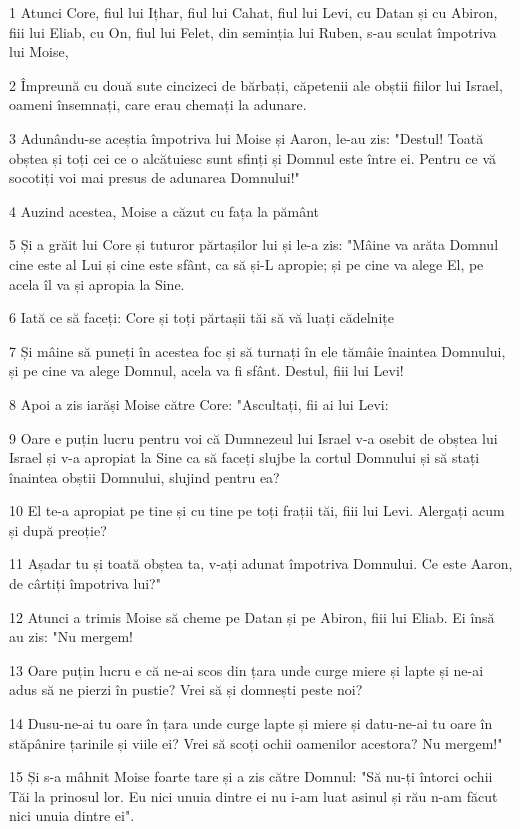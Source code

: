 \par 1 Atunci Core, fiul lui Ițhar, fiul lui Cahat, fiul lui Levi, cu Datan și cu Abiron, fiii lui Eliab, cu On, fiul lui Felet, din seminția lui Ruben, s-au sculat împotriva lui Moise,
\par 2 Împreună cu două sute cincizeci de bărbați, căpetenii ale obștii fiilor lui Israel, oameni însemnați, care erau chemați la adunare.
\par 3 Adunându-se aceștia împotriva lui Moise și Aaron, le-au zis: "Destul! Toată obștea și toți cei ce o alcătuiesc sunt sfinți și Domnul este între ei. Pentru ce vă socotiți voi mai presus de adunarea Domnului!"
\par 4 Auzind acestea, Moise a căzut cu fața la pământ
\par 5 Și a grăit lui Core și tuturor părtașilor lui și le-a zis: "Mâine va arăta Domnul cine este al Lui și cine este sfânt, ca să și-L apropie; și pe cine va alege El, pe acela îl va și apropia la Sine.
\par 6 Iată ce să faceți: Core și toți părtașii tăi să vă luați cădelnițe
\par 7 Și mâine să puneți în acestea foc și să turnați în ele tămâie înaintea Domnului, și pe cine va alege Domnul, acela va fi sfânt. Destul, fiii lui Levi!
\par 8 Apoi a zis iarăși Moise către Core: "Ascultați, fii ai lui Levi:
\par 9 Oare e puțin lucru pentru voi că Dumnezeul lui Israel v-a osebit de obștea lui Israel și v-a apropiat la Sine ca să faceți slujbe la cortul Domnului și să stați înaintea obștii Domnului, slujind pentru ea?
\par 10 El te-a apropiat pe tine și cu tine pe toți frații tăi, fiii lui Levi. Alergați acum și după preoție?
\par 11 Așadar tu și toată obștea ta, v-ați adunat împotriva Domnului. Ce este Aaron, de cârtiți împotriva lui?"
\par 12 Atunci a trimis Moise să cheme pe Datan și pe Abiron, fiii lui Eliab. Ei însă au zis: "Nu mergem!
\par 13 Oare puțin lucru e că ne-ai scos din țara unde curge miere și lapte și ne-ai adus să ne pierzi în pustie? Vrei să și domnești peste noi?
\par 14 Dusu-ne-ai tu oare în țara unde curge lapte și miere și datu-ne-ai tu oare în stăpânire țarinile și viile ei? Vrei să scoți ochii oamenilor acestora? Nu mergem!"
\par 15 Și s-a mâhnit Moise foarte tare și a zis către Domnul: "Să nu-ți întorci ochii Tăi la prinosul lor. Eu nici unuia dintre ei nu i-am luat asinul și rău n-am făcut nici unuia dintre ei".
